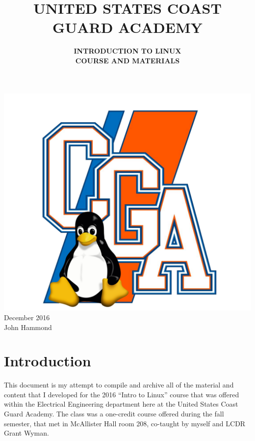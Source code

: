 \documentclass[11pt]{article}
\title{  {\bf UNITED STATES COAST GUARD ACADEMY } }
\author{ { \bf INTRODUCTION TO LINUX } \\ { \bf COURSE AND MATERIALS } }
\date{}
\begin{document}
	
	\maketitle

	\begin{center}
		\graphicspath{ {.} }
		\includegraphics[width=\textwidth,height=\textheight,keepaspectratio]{logo.png}
		\centering
		\vfill
		December 2016 \\
		John Hammond
	\end{center}

	\newpage

	\hrulefill
	\renewcommand*\contentsname{Table of Contents}
	\tableofcontents
	\vfill
	\hrulefill

	\newpage


	\section{Introduction}
	\label{Introduction}
	\paragraph{} This document is my attempt to compile and archive all of the material and content that I developed for the 2016 ``Intro to Linux'' course that was offered within the Electrical Engineering department here at the United States Coast Guard Academy. The class was a one-credit course offered during the fall semester, that met in McAllister Hall room 208, co-taught by myself and LCDR Grant Wyman.
\end{document}
